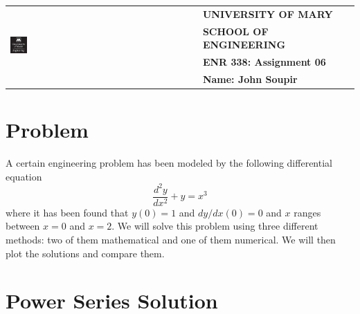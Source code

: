 \documentclass[letterpaper,twocolumn]{article}
\begin{document}
 

\noindent
\begin{tabular}{ll}
 \multirow{4}{5em}{
  \includegraphics[width=0.09\textwidth]{engineering-logo.png}}
   & {\bf UNIVERSITY OF MARY}\\
   & {\bf SCHOOL OF ENGINEERING}\\
   & {\bf ENR 338: Assignment 06}\\
   & {\bf Name: John Soupir}\\
\end{tabular}

\bigskip

\section*{Problem}




A certain engineering problem has been modeled by the 
following differential equation 
\begin{equation*}
\frac{d^2 y}{dx^2} + y = x^3
\end{equation*}
where it has been found that $y(0) = 1$ and $dy/dx(0) = 0$ and
$x$ ranges between $x=0$ and $x=2$.
We will solve this problem using three different methods: two
of them mathematical and one of them numerical. We will then 
plot the solutions and compare them.

\section*{Power Series Solution}
\end{document}
